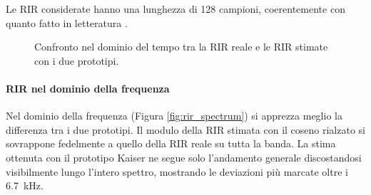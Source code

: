 \documentclass[11pt,a4paper]{article}
\begin{document}
	Le RIR considerate hanno una lunghezza di 128 campioni, coerentemente con quanto fatto in letteratura \cite{11249060}.
		
	\begin{figure}[H]
		\centering
		\caption{Confronto nel dominio del tempo tra la RIR reale e le RIR stimate con i due prototipi.}
		\label{fig:rir_time}
	\end{figure}
	
	\paragraph{RIR nel dominio della frequenza}
	
	Nel dominio della frequenza (Figura \ref{fig:rir_spectrum}) si apprezza meglio la differenza tra i due prototipi.
	Il modulo della RIR stimata con il coseno rialzato si sovrappone fedelmente a quello della RIR reale su tutta la banda.
	La stima ottenuta con il prototipo Kaiser ne segue solo l'andamento generale discostandosi visibilmente lungo l'intero spettro, mostrando le deviazioni più marcate oltre i \SI{6.7}{\kilo\hertz}.
	
\end{document}
